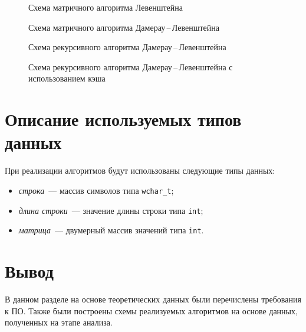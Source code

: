 \begin{figure}[H]
    \centering
    
    \caption{Схема матричного алгоритма Левенштейна}
    \label{fig:lev-iter}
\end{figure}

\begin{figure}[H]
    \centering
    
    \caption{Схема матричного алгоритма Дамерау\,--\,Левенштейна}
    \label{fig:dam-lev-iter}
\end{figure}

\begin{figure}[H]
    \centering
    
    \caption{Схема рекурсивного алгоритма Дамерау\,--\,Левенштейна}
    \label{fig:dam-lev-rec}
\end{figure}

\begin{figure}[H]
    \centering
    
    \caption{Схема рекурсивного алгоритма Дамерау\,--\,Левенштейна с использованием кэша}
    \label{fig:dam-lev-rec-cache}
\end{figure}


\section{Описание используемых типов данных}

При реализации алгоритмов будут использованы следующие типы данных:

\begin{itemize}
    \item \textit{строка}~--- массив символов типа \texttt{wchar\_t};
    \item \textit{длина строки}~--- значение длины строки типа \texttt{int};
    \item \textit{матрица}~--- двумерный массив значений типа \texttt{int}.
\end{itemize}

\section*{Вывод}

В данном разделе на основе теоретических данных были перечислены требования к ПО. Также были построены схемы реализуемых алгоритмов на основе данных, полученных на этапе анализа.